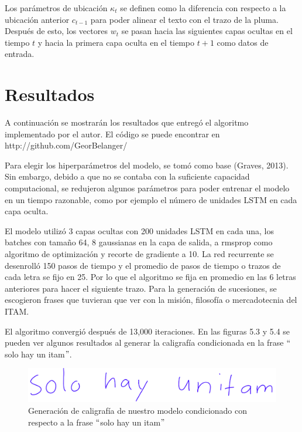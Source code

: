 Los parámetros de ubicación $\kappa_t$ se definen como la diferencia con respecto a la ubicación anterior $c_{t-1}$ para poder alinear el texto con el trazo de la pluma. Después de esto, los vectores $w_t$ se pasan hacia las siguientes capas ocultas en el tiempo $t$ y hacia la primera capa oculta en el tiempo $t+1$ como datos de entrada.


\section{Resultados}

A continuación se mostrarán los resultados que entregó el algoritmo implementado por el autor. El código se puede encontrar en http://github.com/GeorBelanger/

\vspace{1em}

Para elegir los hiperparámetros del modelo, se tomó como base (Graves, 2013). Sin embargo, debido a que no se contaba con la suficiente capacidad computacional, se redujeron algunos parámetros para poder entrenar el modelo en un tiempo razonable, como por ejemplo el número de unidades LSTM en cada capa oculta.

\vspace{1em}

El modelo utilizó 3 capas ocultas con 200 unidades LSTM en cada una, los batches con tamaño 64, 8 gaussianas en la capa de salida, a rmsprop como algoritmo de optimización y recorte de gradiente a 10. La red recurrente se desenrolló 150 pasos de tiempo y el promedio de pasos de tiempo o trazos de cada letra se fijo en 25. Por lo que el algoritmo se fija en promedio en las 6 letras anteriores para hacer el siguiente trazo. Para la generación de sucesiones, se escogieron frases que tuvieran que ver con la misión, filosofía o mercadotecnia del ITAM.

\vspace{1em}

 El algoritmo convergió después de 13,000 iteraciones. En las figuras 5.3 y 5.4 se pueden ver algunos resultados al generar la caligrafía condicionada en la frase $``$solo hay un itam$"$.
 
\begin{figure}[h]
\begin{center}
\includegraphics[width=150mm, scale = 0.8]{./imag/solohay1.png}
\end{center}
\caption{Generación de caligrafía de nuestro modelo condicionado con respecto a la frase $``$solo hay un itam$"$}
\end{figure}


